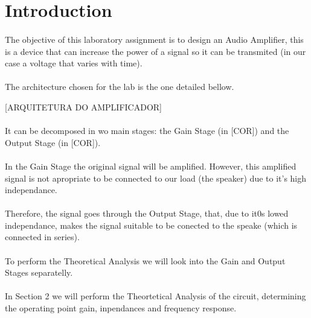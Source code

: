 \section{Introduction}
\label{sec:introduction}

\paragraph{} The objective of this laboratory assignment is to design an Audio Amplifier, this is a device that can increase the power of a 
signal so it can be transmited (in our case a voltage that varies with time).

\paragraph{} The architecture chosen for the lab is the one detailed bellow.

[ARQUITETURA DO AMPLIFICADOR]

\paragraph{} It can be decomposed in wo main stages: the Gain Stage (in [COR])  and the Output Stage (in [COR]).

\paragraph{} In the Gain Stage the original signal will be amplified. However, this amplified signal is not apropriate to be connected to our load (the speaker) due to it's high independance.

\paragraph{} Therefore, the signal goes through the Output Stage, that, due to it0s lowed independance, makes the signal suitable to be conected to the speake (which is connected in series).

\paragraph{} To perform the Theoretical Analysis we will look into the Gain and Output Stages separatelly.

\paragraph{} In Section 2 we will perform the Theortetical Analysis of the circuit, determining the operating point gain, inpendances and frequency response.

